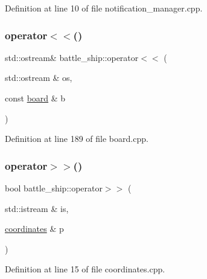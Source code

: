 Definition at line 10 of file notification\+\_\+manager.\+cpp.

\mbox{\label{namespacebattle__ship_a8f319aebd93115655c5cfd648a988e01}} 
\subsubsection{\texorpdfstring{operator$<$$<$()}{operator<<()}\hspace{0.1cm}{\footnotesize\ttfamily [3/3]}}
{\footnotesize\ttfamily std\+::ostream\& battle\+\_\+ship\+::operator$<$$<$ (\begin{DoxyParamCaption}\item[{std\+::ostream \&}]{os,  }\item[{const \hyperlink{classbattle__ship_1_1board}{board} \&}]{b }\end{DoxyParamCaption})}



Definition at line 189 of file board.\+cpp.

\mbox{\label{namespacebattle__ship_ab0747cf7357f5f11e76979fdf9757861}} 
\subsubsection{\texorpdfstring{operator$>$$>$()}{operator>>()}}
{\footnotesize\ttfamily bool battle\+\_\+ship\+::operator$>$$>$ (\begin{DoxyParamCaption}\item[{std\+::istream \&}]{is,  }\item[{\hyperlink{structbattle__ship_1_1coordinates}{coordinates} \&}]{p }\end{DoxyParamCaption})}



Definition at line 15 of file coordinates.\+cpp.

